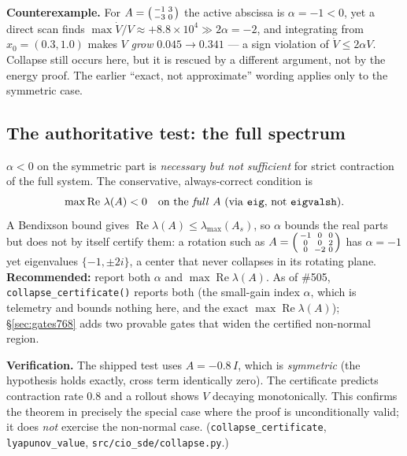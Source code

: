 \documentclass[11pt]{article}
\theoremstyle{definition}
\DeclareMathOperator*{\Real}{Re}
\begin{document}
\begin{caveatbox}
\textbf{Counterexample.} For $A=\begin{psmallmatrix}-1 & 3\\ -3 & 0\end{psmallmatrix}$
the active abscissa is $\alpha=-1<0$, yet a direct scan finds
$\max \dot V/V \approx +8.8\times10^{4} \gg 2\alpha=-2$, and integrating from
$x_0=(0.3,1.0)$ makes $V$ \emph{grow} $0.045\to0.341$ --- a sign violation of
$\dot V\le 2\alpha V$. Collapse still occurs here, but it is rescued by a different
argument, not by the energy proof. The earlier ``exact, not approximate'' wording
applies only to the symmetric case.
\end{caveatbox}

\subsection{The authoritative test: the full spectrum}
$\alpha<0$ on the symmetric part is \emph{necessary but not sufficient} for strict
contraction of the full system. The conservative, always-correct condition is
\begin{equation}
\max \Real\,\lambda(A) < 0 \quad\text{on the \emph{full} } A
\ (\text{via \texttt{eig}, not \texttt{eigvalsh}}).
\end{equation}
A Bendixson bound gives $\Real\lambda(A)\le\lambda_{\max}(A_s)$, so $\alpha$ bounds
the real parts but does not by itself certify them: a rotation such as
$A=\begin{psmallmatrix}-1&0&0\\0&0&2\\0&-2&0\end{psmallmatrix}$ has $\alpha=-1$ yet
eigenvalues $\{-1,\pm 2i\}$, a center that never collapses in its rotating plane.
\textbf{Recommended:} report both $\alpha$ and $\max\Real\lambda(A)$. As of \#505,
\texttt{collapse\_certificate()} reports both (the small-gain index $\alpha$, which is telemetry and
bounds nothing here, and the exact $\max\Real\lambda(A)$); \S\ref{sec:gates768} adds two provable gates that
widen the certified non-normal region.

\begin{verifybox}
\textbf{Verification.} The shipped test uses $A=-0.8\,I$, which is \emph{symmetric}
(the hypothesis holds exactly, cross term identically zero). The certificate
predicts contraction rate $0.8$ and a rollout shows $V$ decaying monotonically.
This confirms the theorem in precisely the special case where the proof is
unconditionally valid; it does \emph{not} exercise the non-normal case.
(\texttt{collapse\_certificate}, \texttt{lyapunov\_value}, \texttt{src/cio\_sde/collapse.py}.)
\end{verifybox}
\end{document}
